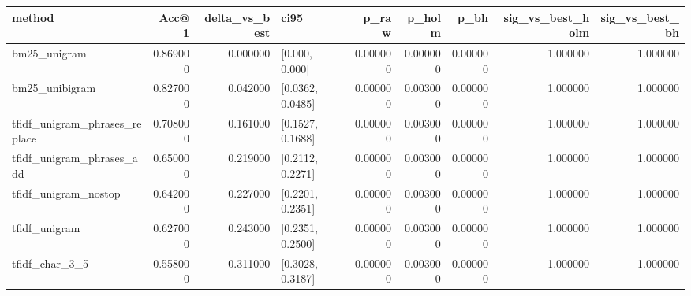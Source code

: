 \begin{tabular}{lrrlrrrrr}
\toprule
method & Acc@1 & delta_vs_best & ci95 & p_raw & p_holm & p_bh & sig_vs_best_holm & sig_vs_best_bh \\
\midrule
bm25_unigram & 0.869000 & 0.000000 & [0.000, 0.000] & 0.000000 & 0.000000 & 0.000000 & 1.000000 & 1.000000 \\
bm25_unibigram & 0.827000 & 0.042000 & [0.0362, 0.0485] & 0.000000 & 0.003000 & 0.000000 & 1.000000 & 1.000000 \\
tfidf_unigram_phrases_replace & 0.708000 & 0.161000 & [0.1527, 0.1688] & 0.000000 & 0.003000 & 0.000000 & 1.000000 & 1.000000 \\
tfidf_unigram_phrases_add & 0.650000 & 0.219000 & [0.2112, 0.2271] & 0.000000 & 0.003000 & 0.000000 & 1.000000 & 1.000000 \\
tfidf_unigram_nostop & 0.642000 & 0.227000 & [0.2201, 0.2351] & 0.000000 & 0.003000 & 0.000000 & 1.000000 & 1.000000 \\
tfidf_unigram & 0.627000 & 0.243000 & [0.2351, 0.2500] & 0.000000 & 0.003000 & 0.000000 & 1.000000 & 1.000000 \\
tfidf_char_3_5 & 0.558000 & 0.311000 & [0.3028, 0.3187] & 0.000000 & 0.003000 & 0.000000 & 1.000000 & 1.000000 \\
\bottomrule
\end{tabular}
